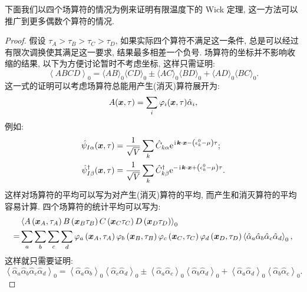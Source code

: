 下面我们以四个场算符的情况为例来证明有限温度下的 Wick 定理, 这一方法可以推广到更多偶数个算符的情况. 
\begin{proof}
假设 $\tau_A>\tau_B>\tau_C>\tau_D$, 如果实际四个算符不满足这一条件, 总是可以经过有限次调换使其满足这一要求, 结果最多相差一个负号. 场算符的坐标并不影响收缩的结果, 以下为方便讨论暂时不考虑坐标, 这样只需证明:
\begin{equation}
\left\langle A B C D\right\rangle_0=\langle A B\rangle_0\langle C D\rangle_0 \pm\langle A C\rangle_0\langle B D\rangle_0+\langle A D\rangle_0\langle B C\rangle_0.
\end{equation}
这一式的证明可以考虑场算符总能用产生(消灭)算符展开为:
\begin{equation}
A(\boldsymbol{x}, \tau)=\sum_i \varphi_i(\boldsymbol{x}, \tau) \hat{\alpha}_i ,
\end{equation}
例如:
\begin{align}
\hat{\psi}_{I \alpha}(\boldsymbol{x}, \tau)&=\frac{1}{\sqrt{V}} \sum_k  \hat{C}_{k \alpha} \mathrm{e}^{\hspace{0.1em}\mathrm{i}\hspace{0.1em} \boldsymbol{k} \cdot \boldsymbol{x}-\left(\epsilon_k^0-\mu\right) \tau};\nonumber\\
\hat{\psi}_{I \beta}^{\dagger}(\boldsymbol{x}, \tau)&=\frac{1}{\sqrt{V}} \sum_k  \hat{C}_{k \beta}^{\dagger} \mathrm{e}^{-\hspace{0.1em}\mathrm{i}\hspace{0.1em} \boldsymbol{k} \cdot \boldsymbol{x}+\left(\epsilon_k^0-\mu\right) \tau} .
\end{align}
这样对场算符的平均可以写为对产生(消灭)算符的平均, 而产生和消灭算符的平均容易计算. 四个场算符的统计平均可以写为:
\begin{align}
& \left\langle A\left(\boldsymbol{x}_A, \tau_A\right) B\left(\boldsymbol{x}_B \tau_B\right) C\left(\boldsymbol{x}_C \tau_C\right) D\left(\boldsymbol{x}_D \tau_D\right)\right\rangle_0 \nonumber\\
= & \sum_a \sum_b \sum_c \sum_d \varphi_a\left(\boldsymbol{x}_A, \tau_A\right) \varphi_b\left(\boldsymbol{x}_B, \tau_B\right) \varphi_c\left(\boldsymbol{x}_C, \tau_C\right) \varphi_d\left(\boldsymbol{x}_D, \tau_D\right)\left\langle\hat{\alpha}_a \hat{\alpha}_b \hat{\alpha}_c \hat{\alpha}_d\right\rangle_0,
\end{align}
这样就只需要证明:
\begin{equation}
\left\langle\hat{\alpha}_a \hat{\alpha}_b \hat{\alpha}_c \hat{\alpha}_d\right\rangle_0=\left\langle\hat{\alpha}_a \hat{\alpha}_b\right\rangle_0\left\langle\hat{\alpha}_c \hat{\alpha}_d\right\rangle_0 \pm\left\langle\hat{\alpha}_a \hat{\alpha}_c\right\rangle_0\left\langle\hat{\alpha}_b \hat{\alpha}_d\right\rangle_0+\left\langle\hat{\alpha}_a \hat{\alpha}_d\right\rangle_0\left\langle\hat{\alpha}_b \hat{\alpha}_c\right\rangle_0 .
\end{equation}


\end{proof}
